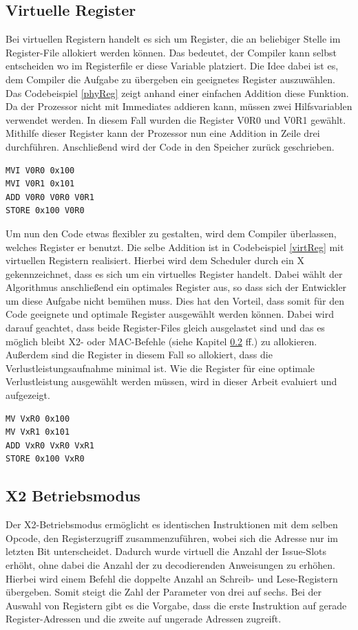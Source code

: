 \subsection{Virtuelle Register}
\label{sub:virtuelleR}
Bei virtuellen Registern handelt es sich um Register, die an beliebiger Stelle im Register-File allokiert werden können. Das bedeutet, der Compiler kann selbst entscheiden wo im Registerfile er diese Variable platziert. 
Die Idee dabei ist es, dem Compiler die Aufgabe zu übergeben ein geeignetes Register auszuwählen. Das Codebeispiel \ref{phyReg} zeigt anhand einer einfachen Addition diese Funktion. Da der Prozessor nicht mit Immediates addieren kann, müssen zwei Hilfsvariablen verwendet werden. In diesem Fall wurden die Register V0R0 und V0R1 gewählt. Mithilfe dieser Register kann der Prozessor nun eine Addition in Zeile drei durchführen. Anschließend wird der Code in den Speicher zurück geschrieben.
\renewcommand{\lstlistingname}{Codebeispiel}
\begin{lstlisting}[frame=single, caption={physikalische Register},captionpos=b,label=phyReg]
MVI V0R0 0x100
MVI V0R1 0x101
ADD V0R0 V0R0 V0R1
STORE 0x100 V0R0
\end{lstlisting}
Um nun den Code etwas flexibler zu gestalten, wird dem Compiler überlassen, welches Register er benutzt. Die selbe Addition ist in Codebeispiel \ref{virtReg} mit virtuellen Registern realisiert. Hierbei wird dem Scheduler durch ein X gekennzeichnet, dass es sich um ein virtuelles Register handelt. Dabei wählt der Algorithmus anschließend ein optimales Register aus, so dass sich der Entwickler um diese Aufgabe nicht bemühen muss. Dies hat den Vorteil, dass somit für den Code geeignete und optimale Register ausgewählt werden können. Dabei wird darauf geachtet, dass beide Register-Files gleich ausgelastet sind und das es möglich bleibt X2- oder MAC-Befehle (siehe Kapitel \ref{subsec:x2Mode} ff.) zu allokieren. Außerdem sind die Register in diesem Fall so allokiert, dass die Verlustleistungsaufnahme minimal ist. Wie die Register für eine optimale Verlustleistung ausgewählt werden müssen, wird in dieser Arbeit evaluiert und aufgezeigt.

\begin{lstlisting}[frame=single,caption={virtuelle Register},captionpos=b,label=virtReg]
MV VxR0 0x100
MV VxR1 0x101
ADD VxR0 VxR0 VxR1
STORE 0x100 VxR0
\end{lstlisting}
\subsection{X2 Betriebsmodus}\label{subsec:x2Mode}
Der X2-Betriebsmodus ermöglicht es identischen Instruktionen mit dem selben Opcode, den Registerzugriff zusammenzuführen, wobei sich die Adresse nur im letzten Bit unterscheidet. Dadurch wurde virtuell die Anzahl der Issue-Slots erhöht, ohne dabei die Anzahl der zu decodierenden Anweisungen zu erhöhen. Hierbei wird einem Befehl die doppelte Anzahl an Schreib- und Lese-Registern übergeben. Somit steigt die Zahl der Parameter von drei auf sechs. Bei der Auswahl von Registern gibt es die Vorgabe, dass die erste Instruktion auf gerade Register-Adressen und die zweite auf ungerade Adressen zugreift. \cite{paya2009instruction}
